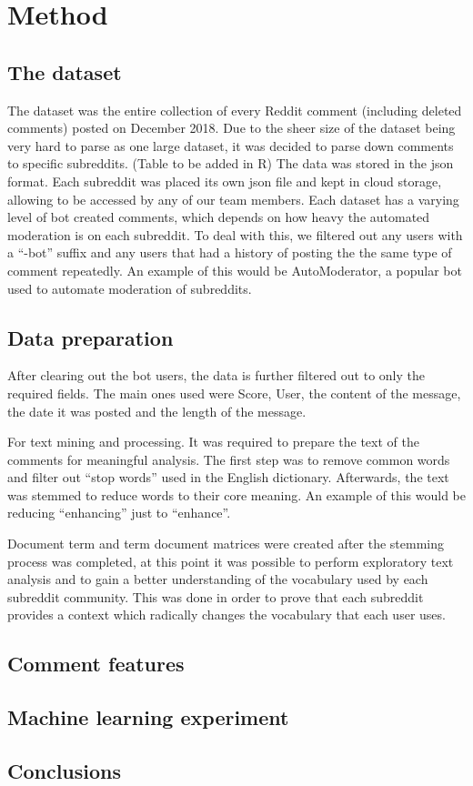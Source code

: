 \chapter{Method}\label{ch:Method}

\section{The dataset}

The dataset was the entire collection of every Reddit comment (including deleted comments) posted on December 2018. Due to the sheer size of the dataset being very hard to parse as one large dataset, it was decided to parse down comments to specific subreddits. (Table to be added in R)  The data was stored in the json format.
\newline
Each subreddit was placed its own json file and kept in cloud storage, allowing to be accessed by any of our team members. Each dataset has a varying level of bot created comments, which depends on how heavy the automated moderation is on each subreddit. To deal with this, we filtered out any users with a “-bot” suffix and any users that had a history of posting the the same type of comment repeatedly. An example of this would be AutoModerator, a popular bot used to automate moderation of subreddits. 

\section {Data preparation}
After clearing out the bot users, the data is further filtered out to only the required fields. The main ones used were Score, User, the content of the message, the date it was posted and the length of the message.

For text mining and processing. It was required to prepare the text of the comments for meaningful analysis. The first step was to remove common words and filter out “stop words” used in the English dictionary. Afterwards, the text was stemmed to reduce words to their core meaning. An example of this would be reducing “enhancing” just to “enhance”. 

Document term and term document matrices were created after the stemming process was completed, at this point it was possible to perform exploratory text analysis and to gain a better understanding of the vocabulary used by each subreddit community. This was done in order to prove that each subreddit provides a context which radically changes the vocabulary that each user uses. 

\section {Comment features}

\section {Machine learning experiment}



\section{Conclusions}




